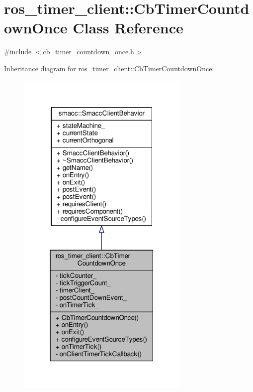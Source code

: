 \hypertarget{classros__timer__client_1_1CbTimerCountdownOnce}{}\section{ros\+\_\+timer\+\_\+client\+:\+:Cb\+Timer\+Countdown\+Once Class Reference}
\label{classros__timer__client_1_1CbTimerCountdownOnce}


{\ttfamily \#include $<$cb\+\_\+timer\+\_\+countdown\+\_\+once.\+h$>$}



Inheritance diagram for ros\+\_\+timer\+\_\+client\+:\+:Cb\+Timer\+Countdown\+Once\+:\nopagebreak
\begin{figure}[H]
\begin{center}
\leavevmode
\includegraphics[width=235pt]{classros__timer__client_1_1CbTimerCountdownOnce__inherit__graph}
\end{center}
\end{figure}


